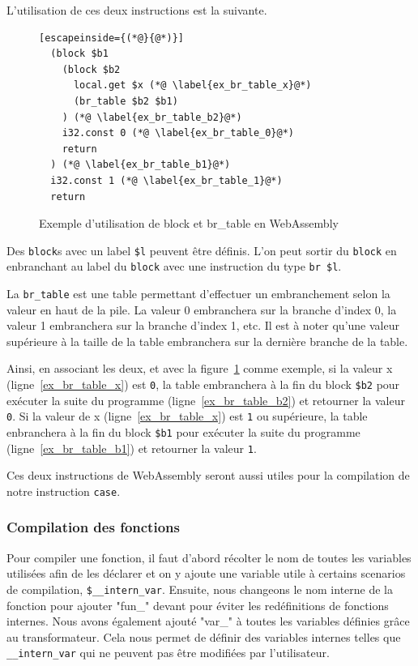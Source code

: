 \documentclass{rapportECL}
\begin{document}
L'utilisation de ces deux instructions est la suivante.

\begin{figure}[H]
	\begin{lstlisting}[escapeinside={(*@}{@*)}]
  (block $b1
    (block $b2
      local.get $x (*@ \label{ex_br_table_x}@*)
      (br_table $b2 $b1)
    ) (*@ \label{ex_br_table_b2}@*)
    i32.const 0 (*@ \label{ex_br_table_0}@*)
    return
  ) (*@ \label{ex_br_table_b1}@*)
  i32.const 1 (*@ \label{ex_br_table_1}@*)
  return
	\end{lstlisting}
	\caption{Exemple d'utilisation de block et br\_table en WebAssembly}
	\label{listing:example_block_br_table}
\end{figure}

Des \verb|block|s avec un label \verb|$l| peuvent être définis. L'on peut sortir du \verb|block| en enbranchant au label du \verb|block| avec une instruction du type \verb|br $l|.

La \verb|br_table| est une table permettant d'effectuer un embranchement selon la valeur en haut de la pile.
La valeur 0 embranchera sur la branche d'index 0, la valeur 1 embranchera sur la branche d'index 1, etc.
Il est à noter qu'une valeur supérieure à la taille de la table embranchera sur la dernière branche de la table.

Ainsi, en associant les deux, et avec la figure~\ref{listing:example_block_br_table} comme exemple, si la valeur x (ligne~\ref{ex_br_table_x}) est \verb|0|, la table embranchera à la fin du block \verb|$b2| pour exécuter la suite du programme (ligne~\ref{ex_br_table_b2}) et retourner la valeur \verb|0|. Si la valeur de x (ligne~\ref{ex_br_table_x}) est \verb|1| ou supérieure, la table enbranchera à la fin du block \verb|$b1| pour exécuter la suite du programme (ligne~\ref{ex_br_table_b1}) et retourner la valeur \verb|1|.

Ces deux instructions de WebAssembly seront aussi utiles pour la compilation de notre instruction \verb|case|.

\subsubsection{Compilation des fonctions}

Pour compiler une fonction, il faut d'abord récolter le nom de toutes les variables utilisées afin de les 
déclarer et on y ajoute une variable utile à certains scenarios de compilation, \verb|$__intern_var|.
Ensuite, nous changeons le nom interne de la fonction pour ajouter "fun\_" devant pour éviter les 
redéfinitions de fonctions internes.
Nous avons également ajouté "var\_" à toutes les variables définies grâce au transformateur.
Cela nous permet de définir des variables internes telles que \verb|__intern_var| qui ne peuvent pas être modifiées par 
l'utilisateur.
\end{document}
